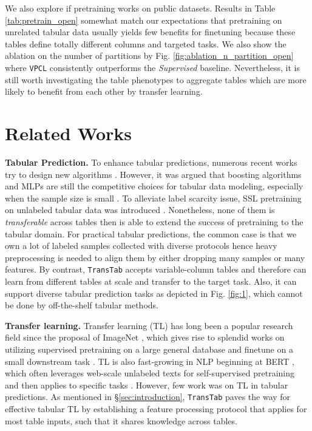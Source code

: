 We also explore if pretraining works on public datasets. Results in Table \ref{tab:pretrain_open} somewhat match our expectations that pretraining on unrelated tabular data usually yields few benefits for finetuning because these tables define totally different columns and targeted tasks. We also show the ablation on the number of partitions by Fig. \ref{fig:ablation_n_partition_open} where \texttt{VPCL} consistently outperforms the \textit{Supervised} baseline. Nevertheless,  it is still worth investigating the table phenotypes to aggregate tables which are more likely to benefit from each other by transfer learning.

\section{Related Works}

\textbf{Tabular Prediction.} To enhance tabular predictions, numerous recent works try to design new algorithms \cite{chen2016xgboost,ke2017lightgbm,dorogush2018catboost,arik2021tabnet,chen2021danets,gorishniy2021revisiting,huang2020tabtransformer,somepalli2021saint,cholakov2022gatedtabtransformer,borisov2021deep,abutbul2020dnf,katzir2020net,luo2020network,guo2021tabgnn,luo2019autocross,qin2021retrieval}. However, it was argued that boosting algorithms and MLPs are still the competitive choices for tabular data modeling, especially when the sample size is small \cite{gorishniy2021revisiting,shwartz2022tabular,borisov2021deep,kadra2021well}. To alleviate label scarcity issue, SSL pretraining on unlabeled tabular data was introduced \cite{yoon2020vime,darabi2021contrastive,somepalli2021saint,ucar2021subtab,bahri2022scarf}. Nonetheless, none of them is \textit{transferable} across tables then is able to extend the success of pretraining to the tabular domain. For practical tabular predictions, the common case is that we own a lot of labeled samples collected with diverse protocols hence heavy preprocessing is needed to align them by either dropping many samples or many features. By contrast, \texttt{TransTab} accepts variable-column tables and therefore can learn from different tables at scale and transfer to the target task. Also, it can support diverse tabular prediction tasks as depicted in Fig. \ref{fig:1}, which cannot be done by off-the-shelf tabular methods.

\textbf{Transfer learning.} Transfer learning (TL) has long been a popular research field since the proposal of ImageNet \cite{deng2009imagenet}, which gives rise to splendid works on utilizing supervised pretraining on a large general database and finetune on a small downstream task \cite{simonyan2014very,yosinski2014transferable,he2016deep,huang2017densely,zoph2018learning}. TL is also fast-growing in NLP beginning at BERT \cite{devlin2018bert}, which often leverages web-scale unlabeled texts for self-supervised pretraining and then applies to specific tasks \cite{brown2020language,liu2019roberta,raffel2020exploring,yang2019xlnet,lewis2020bart}. However, few work was on TL in tabular predictions. As mentioned in \S \ref{sec:introduction}, \texttt{TransTab} paves the way for effective tabular TL by establishing a feature processing protocol that applies for most table inputs, such that it shares knowledge across tables.

